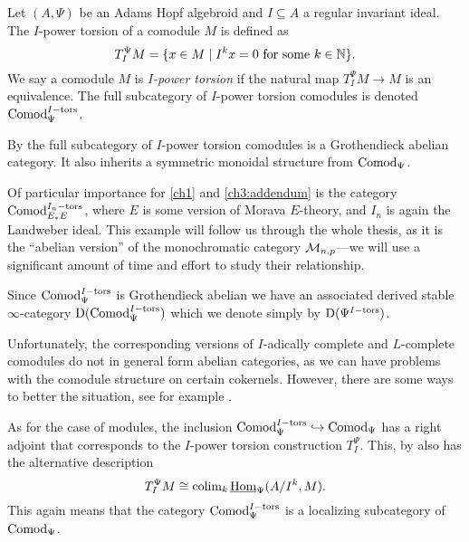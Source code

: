 \begin{definition}
    \label{ch0:def:I-power-torsion-comodule}
    Let $(A,\Psi)$ be an Adams Hopf algebroid and $I\subseteq A$ a regular invariant ideal. The $I$-power torsion of a comodule $M$ is defined as 
    \[T_I^\Psi M = \{x\in M \mid I^kx = 0 \text{ for some } k\in \mathbb{N}\}.\]
    We say a comodule $M$ is \emph{$I$-power torsion} if the natural map $T_I^\Psi M\longrightarrow M$ is an equivalence. The full subcategory of $I$-power torsion comodules is denoted $\mathrm{Comod}_\Psi^{I-\mathrm{tors}}$. 
\end{definition}

\begin{remark}
    \label{ch0:rm:torsion-comodules-grothendieck-monoidal}
    By \cite[5.10]{barthel-heard-valenzuela_2018} the full subcategory of $I$-power torsion comodules is a Grothendieck abelian category. It also inherits a symmetric monoidal structure from $\mathrm{Comod}_\Psi$.
\end{remark}

\begin{example}
    Of particular importance for \cref{ch1} and \cref{ch3:addendum} is the category $\mathrm{Comod}_{E_*E}^{I_n-\mathrm{tors}}$, where $E$ is some version of Morava $E$-theory, and $I_n$ is again the Landweber ideal. This example will follow us through the whole thesis, as it is the ``abelian version'' of the monochromatic category $\mathcal{M}_{n,p}$---we will use a significant amount of time and effort to study their relationship. 
\end{example}

\begin{notation}
    Since $\mathrm{Comod}_\Psi^{I-\mathrm{tors}}$ is Grothendieck abelian we have an associated derived stable $\infty$-category $\mathrm{D}(\mathrm{Comod}_\Psi^{I-\mathrm{tors}})$ which we denote simply by $\mathrm{D}(\Psi^{I-\mathrm{tors}})$.
\end{notation}

\begin{remark}
    \label{ch0:rm:complete-comodules-not-abelian}
    Unfortunately, the corresponding versions of $I$-adically complete and $L$-complete comodules do not in general form abelian categories, as we can have problems with the comodule structure on certain cokernels. However, there are some ways to better the situation, see for example \cite{baker_2009}. 
\end{remark}

\begin{remark}
    As for the case of modules, the inclusion $\mathrm{Comod}_\Psi^{I-\mathrm{tors}}\hookrightarrow \mathrm{Comod}_\Psi$ has a right adjoint that corresponds to the $I$-power torsion construction $T_I^\Psi$. This, by \cite[5.5]{barthel-heard-valenzuela_2018} also has the alternative description
    \[T_I^\Psi M \cong \operatorname{colim}_k \operatorname{\underline{Hom}}_\Psi (A/I^k, M).\]
    This again means that the category $\mathrm{Comod}_\Psi^{I-\mathrm{tors}}$ is a localizing subcategory of $\mathrm{Comod}_\Psi$. 
\end{remark}

